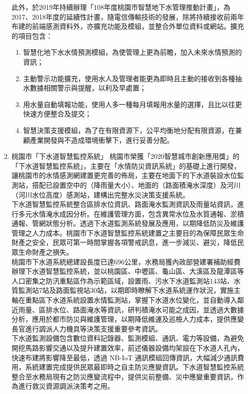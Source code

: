 \documentclass[a4paper,12pt]{article}
\begin{document}
\begin{enumerate}
此外，於2019年持續辦理「108年度桃園市智慧地下水管理推動計畫」，為2017、2018年度的延續性計畫，隨電信傳輸技術的發展，除將持續接收前兩年布建的前端感測資料外，亦擴充功能及模組，並整合外單位資料或網站。擴充的項目包含：\\
\begin{enumerate}
\item 智慧化地下水水情預測模組，為使管理上更為前瞻，加入未來水情預測的資訊；\\
\item 主動警示功能擴充，使用水人及管理者能更為即時且主動的接收到各種抽水數據相關警示與提醒，以利及早處置；\\
\item 用水量自動填報功能，使用人多一種每月填報用水量的選擇，且比以往更快速方便整合及提交；\\
\item 智慧決策支援模組，為了在有限資源下，公平均衡地分配有限資源，在兼顧產業開發與不造成環境衝擊下，進行妥善分配。\\
\end{enumerate}
\item 桃園市「下水道智慧監控系統」
\label{sec:org7eb24c5}
桃園市榮獲「2020智慧城市創新應用獎」的「下水道智慧監控系統」，主要在「水情防災資訊系統」的基礎上進行開發，讓桃園市的水情感測網建置更完善的佈局，主要在地面下的下水道裝設水位監測站，搭配已設置空中的（降雨量大小）、地面的（路面積淹水深度）及河川（河川水位高度）感測站，建構出完整水災決策支援系統。\\

下水道智慧監控系統整合區排水位資訊、路面淹水監測資訊及雨量站資訊，進行多元水情淹水成因分析。在維護管理方面，包含異常水位及水質通報、淤積通報、管網狀態分析。透過下水道監測系統發展及應用，以期降低防災及維護管理之人力成本。桃園市下水道智慧監控系統建置之主要目的為保障民眾生命財產之安全，民眾可第一時間掌握各項警戒訊息，進一步減災、避災，降低民眾生命財產之損失。\\

桃園市下水道系統總建設長度已達696公里，水務局獲內政部營建署補助經費辦理下水道智慧監控系統，並以桃園區、中壢區、龜山區、大溪區及龍潭區等人口密集之防汛重點區作為示範區域，設置雨、污水下水道監測站143站、水質監測站7站及路面監視站30站，以期即時瞭解下水道系統運作狀況，實施主軸在重點區下水道系統設置水情監測站，掌握下水道水位變化，並自動導入鄰近雨量、區排水位、路面淹水等資訊，研判積淹水可能之成因，並透過大數據分析，應用於都市防災與維護管理，以期降低維運及巡檢人力成本，提供應變長官進行調派人力機具等決策支援重要參考資訊。\\

下水道監測設備包含數位資料記錄器、監測模組、通訊、電力等設備，為避免開挖馬路影響交通以及提升建置效率，前述儀器設備均架設在下水道人孔內，快速布建將影響降至最低，透過 NB-IoT 通訊模組回傳資訊，大幅減少通訊費用，系統建置完成提供民眾最即時之自主防災應變資訊。下水道智慧監控系統整合至水務局現有之防災應變流程中，提供災前整備、災中應變重要資訊，作為進行救災資源調派決策考之用。\\
\end{enumerate}
\end{document}
